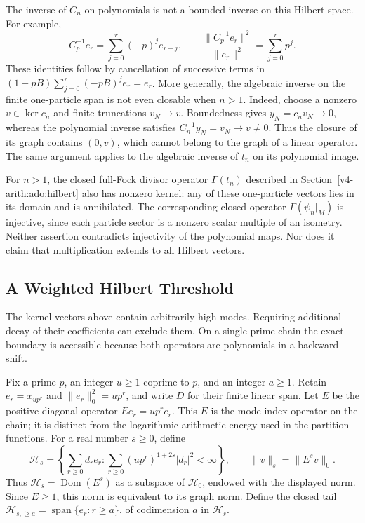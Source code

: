 The inverse of \(C_n\) on polynomials is not a bounded inverse on this
Hilbert space. For example,
\[
 C_p^{-1}e_r=\sum_{j=0}^r(-p)^j e_{r-j},\qquad
 \frac{\|C_p^{-1}e_r\|^2}{\|e_r\|^2}=\sum_{j=0}^r p^j.
\]
These identities follow by cancellation of successive terms in
\((1+pB)\sum_{j=0}^r(-pB)^j e_r=e_r\).
More generally, the algebraic inverse on the finite one-particle span
is not even closable when \(n>1\). Indeed, choose a nonzero
\(v\in\ker c_n\) and finite truncations \(v_N\to v\).
Boundedness gives \(y_N=c_nv_N\to0\), whereas the polynomial inverse
satisfies \(C_n^{-1}y_N=v_N\to v\ne0\). Thus the closure of its graph
contains \((0,v)\), which cannot belong to the graph of a linear
operator. The same argument applies to the algebraic inverse of
\(t_n\) on its polynomial image.

For \(n>1\), the closed full-Fock divisor operator \(\Gamma(t_n)\)
described in Section~\ref{v4-arith:ado:hilbert} also has nonzero kernel:
any of these one-particle vectors lies in its domain and is annihilated.
The corresponding closed operator \(\Gamma(\psi_n|_M)\) is injective,
since each particle sector is a nonzero scalar multiple of an isometry.
Neither assertion contradicts injectivity of the polynomial maps.
Nor does it claim that multiplication extends to all Hilbert vectors.

\subsection{A Weighted Hilbert Threshold}
\label{v4-arith:ado:weighted-threshold}

The kernel vectors above contain arbitrarily high modes. Requiring
additional decay of their coefficients can exclude them. On a single
prime chain the exact boundary is accessible because both operators
are polynomials in a backward shift.

Fix a prime \(p\), an integer \(u\ge1\) coprime to \(p\), and an
integer \(a\ge1\). Retain \(e_r=x_{up^r}\) and
\(\|e_r\|_0^2=up^r\), and write \(D\) for their finite linear span.
Let \(E\) be the positive diagonal operator
\(Ee_r=up^r e_r\). This \(E\) is the mode-index operator on the chain;
it is distinct from the logarithmic arithmetic energy used in the
partition functions. For a real number \(s\ge0\), define
\begin{equation}
\label{v4-arith:ado:weighted-space}
 \mathcal H_s=
 \left\{\sum_{r\ge0}d_re_r:
   \sum_{r\ge0}(up^r)^{1+2s}|d_r|^2<\infty\right\},
 \qquad \|v\|_s=\|E^sv\|_0.
\end{equation}
Thus \(\mathcal H_s=\operatorname{Dom}(E^s)\) as a subspace of
\(\mathcal H_0\), endowed with the displayed norm. Since \(E\ge1\),
this norm is equivalent to its graph norm. Define the closed tail
\(\mathcal H_{s,\ge a}=\overline{\operatorname{span}}\{e_r:r\ge a\}\),
of codimension \(a\) in \(\mathcal H_s\).

